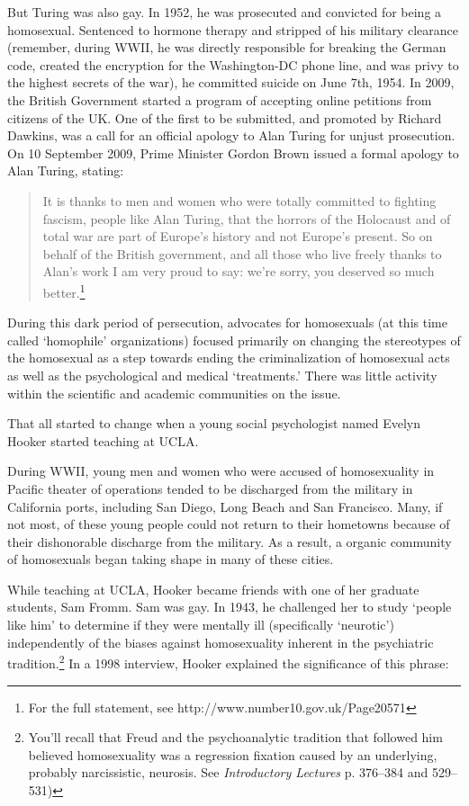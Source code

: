 \begin{refsection}
But Turing was also gay. In 1952, he was prosecuted and convicted for being a homosexual. Sentenced to hormone therapy and stripped of his military clearance (remember, during WWII, he was directly responsible for breaking the German code, created the encryption for the Washington-DC phone line, and was privy to the highest secrets of the war), he committed suicide on June 7th, 1954. In 2009, the British Government started a program of accepting online petitions from citizens of the UK. One of the first to be submitted, and promoted by Richard Dawkins, was a call for an official apology to Alan Turing for unjust prosecution. On 10 September 2009, Prime Minister Gordon Brown issued a formal apology to Alan Turing, stating:

\begin{quote}

It is thanks to men and women who were totally committed to fighting fascism, people like Alan Turing, that the horrors of the Holocaust and of total war are part of Europe's history and not Europe's present. So on behalf of the British government, and all those who live freely thanks to Alan's work I am very proud to say: we're sorry, you deserved so much better.\footnote{For the full statement, see http:\slash \slash www.number10.gov.uk\slash Page20571}
\end{quote}

During this dark period of persecution, advocates for homosexuals (at this time called `homophile' organizations) focused primarily on changing the stereotypes of the homosexual as a step towards ending the criminalization of homosexual acts as well as the psychological and medical `treatments.' There was little activity within the scientific and academic communities on the issue. 

That all started to change when a young social psychologist named Evelyn Hooker started teaching at UCLA.

During WWII, young men and women who were accused of homosexuality in Pacific theater of operations tended to be discharged from the military in California ports, including San Diego, Long Beach and San Francisco. Many, if not most, of these young people could not return to their hometowns because of their dishonorable discharge from the military. As a result, a organic community of homosexuals began taking shape in many of these cities.

While teaching at UCLA, Hooker became friends with one of her graduate students, Sam Fromm. Sam was gay. In 1943, he challenged her to study `people like him' to determine if they were mentally ill (specifically `neurotic') independently of the biases against homosexuality inherent in the psychiatric tradition.\footnote{You'll recall that Freud and the psychoanalytic tradition that followed him believed homosexuality was a regression fixation caused by an underlying, probably narcissistic, neurosis. See \emph{Introductory Lectures} p. 376--384 and 529--531)} In a 1998 interview, Hooker explained the significance of this phrase:


\end{refsection}
